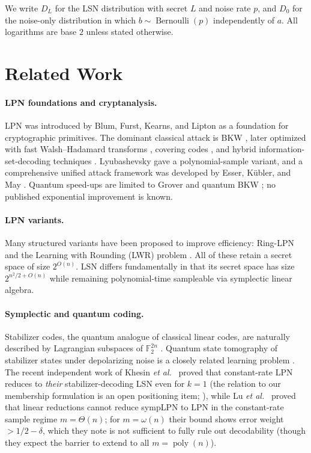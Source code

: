 \documentclass[11pt,a4paper]{article}
\theoremstyle{plain}
\theoremstyle{definition}
\newcommand{\F}{\mathbb{F}}
\newcommand{\etal}{\textit{et al.}}
\begin{document}
We write $D_L$ for the LSN distribution with secret $L$ and noise rate $p$, and $D_0$ for the noise-only distribution in which $b \sim \operatorname{Bernoulli}(p)$ independently of $a$. All logarithms are base $2$ unless stated otherwise.


\section{Related Work}
\label{sec:related}

\paragraph{LPN foundations and cryptanalysis.}
LPN was introduced by Blum, Furst, Kearns, and Lipton \cite{BFKL94} as a foundation for cryptographic primitives. The dominant classical attack is BKW \cite{BKW03}, later optimized with fast Walsh--Hadamard transforms \cite{LF06}, covering codes \cite{GJL14}, and hybrid information-set-decoding techniques \cite{EKM17}. Lyubashevsky \cite{Lyu05} gave a polynomial-sample variant, and a comprehensive unified attack framework was developed by Esser, K{\"u}bler, and May \cite{EKM17}. Quantum speed-ups are limited to Grover \cite{Gro96} and quantum BKW \cite{Kir11}; no published exponential improvement is known.

\paragraph{LPN variants.}
Many structured variants have been proposed to improve efficiency: Ring-LPN \cite{HKL+12} and the Learning with Rounding (LWR) problem \cite{BPR12}. All of these retain a secret space of size $2^{O(n)}$. LSN differs fundamentally in that its secret space has size $2^{n^2/2 + O(n)}$ while remaining polynomial-time sampleable via symplectic linear algebra.

\paragraph{Symplectic and quantum coding.}
Stabilizer codes, the quantum analogue of classical linear codes, are naturally described by Lagrangian subspaces of $\F_2^{2n}$ \cite{Got97,CRSS98,NC00}. Quantum state tomography of stabilizer states under depolarizing noise is a closely related learning problem \cite{GL22}. The recent independent work of Khesin \etal\ \cite{KLP+25} proved that constant-rate LPN reduces to \emph{their} stabilizer-decoding LSN even for $k=1$ (the relation to our membership formulation is an open positioning item; ), while Lu \etal\ \cite{LPQR26} proved that linear reductions cannot reduce sympLPN to LPN in the constant-rate sample regime $m=\Theta(n)$; for $m=\omega(n)$ their bound shows error weight $>1/2-\delta$, which they note is not sufficient to fully rule out decodability (though they expect the barrier to extend to all $m=\operatorname{poly}(n)$).
\end{document}
